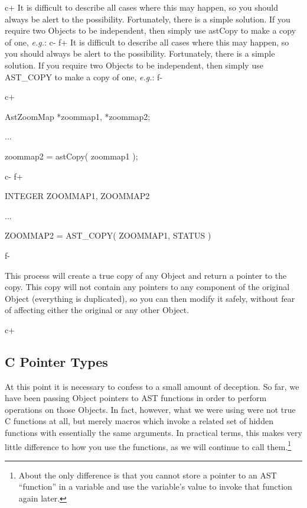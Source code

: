 \documentclass[twoside,11pt]{starlink}
\begin{document}
c+
It is difficult to describe all cases where this may happen, so you
should always be alert to the possibility. Fortunately, there is a
simple solution. If you require two Objects to be independent, then
simply use astCopy to make a copy of one, \emph{e.g.}:
c-
f+
It is difficult to describe all cases where this may happen, so you
should always be alert to the possibility. Fortunately, there is a
simple solution. If you require two Objects to be independent, then
simply use AST\_COPY to make a copy of one, \emph{e.g.}:
f-

c+
\small
\begin{terminalv}
AstZoomMap *zoommap1, *zoommap2;

...

zoommap2 = astCopy( zoommap1 );
\end{terminalv}
\normalsize
c-
f+
\small
\begin{terminalv}
      INTEGER ZOOMMAP1, ZOOMMAP2

      ...

      ZOOMMAP2 = AST_COPY( ZOOMMAP1, STATUS )
\end{terminalv}
\normalsize
f-

This process will create a true copy of any Object and return a
pointer to the copy. This copy will not contain any pointers to any
component of the original Object (everything is duplicated), so you
can then modify it safely, without fear of affecting either the
original or any other Object.


c+
\subsection{C Pointer Types}

At this point it is necessary to confess to a small amount of
deception. So far, we have been passing Object pointers to AST
functions in order to perform operations on those Objects. In fact,
however, what we were using were not true C functions at all, but
merely macros which invoke a related set of hidden functions with
essentially the same arguments. In practical terms, this makes very
little difference to how you use the functions, as we will continue to
call them.\footnote{About the only difference is that you cannot store
a pointer to an AST ``function'' in a variable and use the variable's
value to invoke that function again later.}
\end{document}
